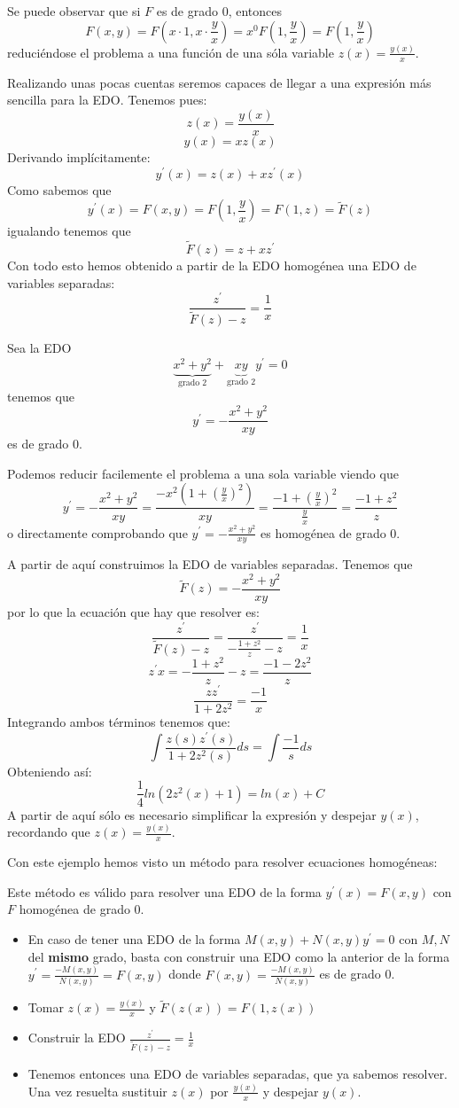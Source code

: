 \documentclass{mathnotes}
\begin{document}
Se puede observar que si $F$ es de grado $0$, entonces
$$F(x,y) = F(x\cdot 1, x\cdot \frac{y}{x}) = x^0 F(1,\frac{y}{x}) = F(1, \frac{y}{x})$$
reduciéndose el problema a una función de una sóla variable $z(x)=\frac{y(x)}{x}$.

Realizando unas pocas cuentas seremos capaces de llegar a una expresión más sencilla para la EDO.
Tenemos pues:
$$z(x) = \frac{y(x)}{x}$$
$$y(x) = xz(x)$$
Derivando implícitamente:
$$y^\prime(x) = z(x) + xz^\prime(x)$$
Como sabemos que $$y^\prime(x) = F(x,y) = F(1, \frac{y}{x}) = F(1, z) = \tilde{F}(z)$$
igualando tenemos que $$\tilde{F}(z) = z + xz^\prime$$
Con todo esto hemos obtenido a partir de la EDO homogénea una EDO de variables separadas:
$$\frac{z^\prime}{\tilde{F}(z)-z} = \frac{1}{x}$$

\begin{example}
Sea la EDO $$\underbrace{x^2+y^2}_\text{grado 2} + \underbrace{xy}_\text{grado 2}y^\prime = 0$$ tenemos que $$y^\prime = -\frac{x^2+y^2}{xy}$$ es de grado $0$.

Podemos reducir facilemente el problema a una sola variable viendo que 
$$y^\prime = -\frac{x^2+y^2}{xy} = \frac{-x^2(1+(\frac{y}{x})^2)}{xy} = \frac{-1+(\frac{y}{x})^2}{\frac{y}{x}} = \frac{-1+z^2}{z}$$
o directamente comprobando que $y^\prime = -\frac{x^2+y^2}{xy}$ es homogénea de grado 0.

A partir de aquí construimos la EDO de variables separadas. Tenemos que $$\tilde{F}(z) = -\frac{x^2+y^2}{xy}$$ por lo que la ecuación que hay que resolver es:
$$\frac{z^\prime}{\tilde{F}(z)-z} = \frac{z^\prime}{-\frac{1+z^2}{z}-z} = \frac{1}{x}$$
$$z^\prime x = -\frac{1+z^2}{z}-z = \frac{-1-2z^2}{z}$$
$$\frac{zz^\prime}{1+2z^2} = \frac{-1}{x}$$
Integrando ambos términos tenemos que:
$$\int \frac{z(s)z^\prime(s)}{1+2z^2(s)}ds = \int\frac{-1}{s}ds$$
Obteniendo así:
$$\frac{1}{4}ln(2z^2(x)+1) = ln(x) + C$$
A partir de aquí sólo es necesario simplificar la expresión y despejar $y(x)$, recordando que $z(x) = \frac{y(x)}{x}$.
\end{example}

Con este ejemplo hemos visto un método para resolver ecuaciones homogéneas:
\begin{method}
Este método es válido para resolver una EDO de la forma $y^\prime(x) = F(x,y)$ con $F$ homogénea de grado 0.
\begin{itemize}
\item En caso de tener una EDO de la forma $M(x,y) + N(x,y)y^\prime = 0$ con $M,N$ del \textbf{mismo} grado, basta con construir una EDO como la anterior de la forma $y^\prime = \frac{-M(x,y)}{N(x,y)} = F(x,y)$ donde $F(x,y) = \frac{-M(x,y)}{N(x,y)}$ es de grado 0.

\item Tomar $z(x) = \frac{y(x)}{x}$ y $\tilde{F}(z(x)) = F(1,z(x))$
\item Construir la EDO $\frac{z^\prime}{\tilde{F}(z) - z} = \frac{1}{x}$
\item Tenemos entonces una EDO de variables separadas, que ya sabemos resolver. Una vez resuelta sustituir $z(x)$ por $\frac{y(x)}{x}$ y despejar $y(x)$.
\end{itemize}
\end{method}
\end{document}
